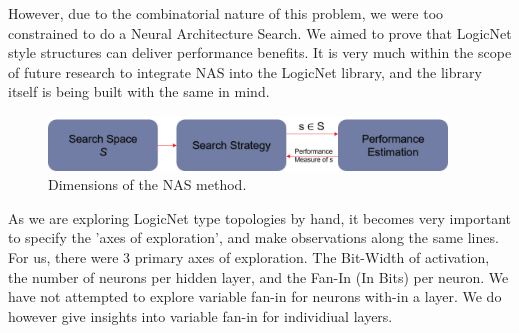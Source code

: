 However, due to the combinatorial nature of this problem, we were too constrained to do a Neural Architecture Search. We aimed to prove that LogicNet style structures can deliver performance benefits. It is very much within the scope of future research to integrate NAS into the LogicNet library, and the library itself is being built with the same in mind. 
\begin{figure}[h]
    \centering
    \includegraphics[width=300pt]{figures/bison/NAS.png}
    \caption{Dimensions of the NAS method.}
    \label{fig:NAS}
\end{figure}

As we are exploring LogicNet type topologies by hand, it becomes very important to specify the 'axes of exploration', and make observations along the same lines. For us, there were 3 primary axes of exploration. The Bit-Width of activation, the number of neurons per hidden layer, and the Fan-In (In Bits) per neuron. We have not attempted to explore variable fan-in for neurons with-in a layer. We do however give insights into variable fan-in for individiual layers.


